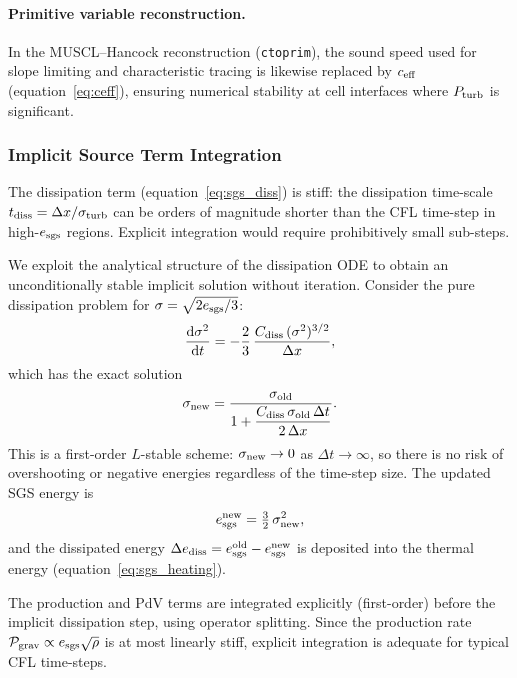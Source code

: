 \documentclass[fleqn,usenatbib]{mnras}
\newcommand{\dx}{\Delta x}
\newcommand{\code}[1]{\texttt{#1}}
\begin{document}
\paragraph{Primitive variable reconstruction.}
In the MUSCL--Hancock reconstruction (\code{ctoprim}), the sound
speed used for slope limiting and characteristic tracing is likewise
replaced by $c_{\rm eff}$ (equation~\ref{eq:ceff}), ensuring
numerical stability at cell interfaces where $P_{\rm turb}$ is
significant.


\subsubsection{Implicit Source Term Integration}
\label{sec:sgs_implicit}

The dissipation term (equation~\ref{eq:sgs_diss}) is stiff:
the dissipation time-scale $t_{\rm diss} = \dx/\sigma_{\rm turb}$
can be orders of magnitude shorter than the CFL time-step in
high-$e_{\rm sgs}$ regions.  Explicit integration would require
prohibitively small sub-steps.

We exploit the analytical structure of the dissipation ODE to obtain
an unconditionally stable implicit solution without iteration.
Consider the pure dissipation problem for
$\sigma = \sqrt{2e_{\rm sgs}/3}$:
\begin{equation}
  \frac{\mathrm{d}\sigma^2}{\mathrm{d}t}
  = -\frac{2}{3}\,\frac{C_{\rm diss}\,(\sigma^2)^{3/2}}{\dx},
\end{equation}
which has the exact solution
\begin{equation}
  \sigma_{\rm new}
  = \frac{\sigma_{\rm old}}{
    1 + \dfrac{C_{\rm diss}\,\sigma_{\rm old}\,\Delta t}{2\,\dx}}.
  \label{eq:sigma_implicit}
\end{equation}
This is a first-order $L$-stable scheme: $\sigma_{\rm new} \to 0$ as
$\Delta t \to \infty$, so there is no risk of overshooting or
negative energies regardless of the time-step size.  The updated SGS
energy is
\begin{equation}
  e_{\rm sgs}^{\rm new} = \tfrac{3}{2}\,\sigma_{\rm new}^2,
\end{equation}
and the dissipated energy
$\Delta e_{\rm diss} = e_{\rm sgs}^{\rm old} - e_{\rm sgs}^{\rm new}$
is deposited into the thermal energy
(equation~\ref{eq:sgs_heating}).

The production and PdV terms are integrated explicitly (first-order)
before the implicit dissipation step, using operator splitting.
Since the production rate
$\mathcal{P}_{\rm grav} \propto e_{\rm sgs}\sqrt{\rho}$ is at most
linearly stiff, explicit integration is adequate for typical CFL
time-steps.
\end{document}
